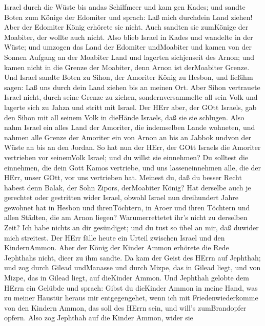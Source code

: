 Israel durch die Wüste bis andas Schilfmeer und kam gen Kades;
 und sandte Boten zum Könige der Edomiter und sprach: Laß
mich durchdein Land ziehen! Aber der Edomiter König erhörete sie nicht.
Auch sandten sie zumKönige der Moabiter, der wollte auch nicht. Also
blieb Israel in Kades  und wandelte in der Wüste; und
umzogen das Land der Edomiter undMoabiter und kamen von der Sonnen
Aufgang an der Moabiter Land und lagerten sichjenseit des Arnon; und
kamen nicht in die Grenze der Moabiter, denn Arnon ist derMoabiter
Grenze.  Und Israel sandte Boten zu Sihon, der Amoriter
König zu Hesbon, und ließihm sagen: Laß uns durch dein Land ziehen bis
an meinen Ort.  Aber Sihon vertrauete Israel nicht, durch
seine Grenze zu ziehen, sondernversammelte all sein Volk und lagerte
sich zu Jahza und stritt mit Israel.  Der HErr aber, der
GOtt Israels, gab den Sihon mit all seinem Volk in dieHände Israels, daß
sie sie schlugen. Also nahm Israel ein alles Land der Amoriter, die
indemselben Lande wohneten,  und nahmen alle Grenze der
Amoriter ein von Arnon an bis an Jabbok undvon der Wüste an bis an den
Jordan.  So hat nun der HErr, der GOtt Israels die Amoriter
vertrieben vor seinemVolk Israel; und du willst sie einnehmen?
 Du solltest die einnehmen, die dein Gott Kamos vertriebe,
und uns lasseneinnehmen alle, die der HErr, unser GOtt, vor uns
vertrieben hat.  Meinest du, daß du besser Recht habest
denn Balak, der Sohn Zipors, derMoabiter König? Hat derselbe auch je
gerechtet oder gestritten wider Israel,  obwohl Israel nun
dreihundert Jahre gewohnet hat in Hesbon und ihrenTöchtern, in Aroer und
ihren Töchtern und allen Städten, die am Arnon liegen? Warumerrettetet
ihr's nicht zu derselben Zeit?  Ich habe nichts an dir
gesündiget; und du tust so übel an mir, daß duwider mich streitest. Der
HErr fälle heute ein Urteil zwischen Israel und den KindernAmmon.
 Aber der König der Kinder Ammon erhörete die Rede
Jephthahs nicht, dieer zu ihm sandte.  Da kam der Geist des
HErrn auf Jephthah; und zog durch Gilead undManasse und durch Mizpe, das
in Gilead liegt, und von Mizpe, das in Gilead liegt, auf dieKinder
Ammon.  Und Jephthah gelobte dem HErrn ein Gelübde und
sprach: Gibst du dieKinder Ammon in meine Hand,  was zu
meiner Haustür heraus mir entgegengehet, wenn ich mit Friedenwiederkomme
von den Kindern Ammon, das soll des HErrn sein, und will's zumBrandopfer
opfern.  Also zog Jephthah auf die Kinder Ammon, wider sie
